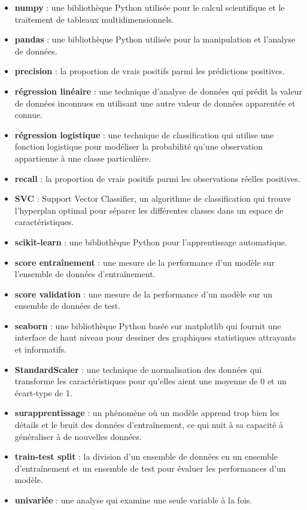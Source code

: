\begin{itemize}
	\item \textbf{numpy} : une bibliothèque Python utilisée pour le calcul scientifique et le traitement de tableaux multidimensionnels.
	\item \textbf{pandas} : une bibliothèque Python utilisée pour la manipulation et l'analyse de données.
	\item \textbf{precision} : la proportion de vrais positifs parmi les prédictions positives.
	\item \textbf{régression linéaire} : une technique d'analyse de données qui prédit la valeur de données inconnues en utilisant une autre valeur de données apparentée et connue.
	\item \textbf{régression logistique} : une technique de classification qui utilise une fonction logistique pour modéliser la probabilité qu'une observation appartienne à une classe particulière.
	\item \textbf{recall} : la proportion de vrais positifs parmi les observations réelles positives.
	\item \textbf{SVC} : Support Vector Classifier, un algorithme de classification qui trouve l'hyperplan optimal pour séparer les différentes classes dans un espace de caractéristiques.
	\item \textbf{scikit-learn} : une bibliothèque Python pour l'apprentissage automatique.
	\item \textbf{score entraînement} : une mesure de la performance d'un modèle sur l'ensemble de données d'entraînement.
	\item \textbf{score validation} : une mesure de la performance d'un modèle sur un ensemble de données de test.
	\item \textbf{seaborn} : une bibliothèque Python basée sur matplotlib qui fournit une interface de haut niveau pour dessiner des graphiques statistiques attrayants et informatifs.
	\item \textbf{StandardScaler} : une technique de normalisation des données qui transforme les caractéristiques pour qu'elles aient une moyenne de 0 et un écart-type de 1.
	\item \textbf{surapprentissage} : un phénomène où un modèle apprend trop bien les détails et le bruit des données d'entraînement, ce qui nuit à sa capacité à généraliser à de nouvelles données.
	\item \textbf{train-test split} : la division d'un ensemble de données en un ensemble d'entraînement et un ensemble de test pour évaluer les performances d'un modèle.
	\item \textbf{univariée} : une analyse qui examine une seule variable à la fois.

\end{itemize}
